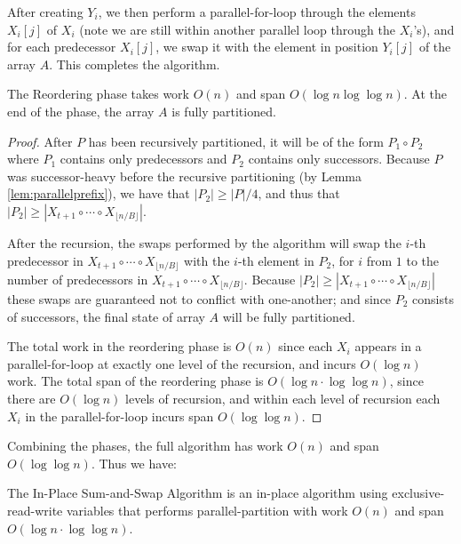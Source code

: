 \documentclass[a4paper,UKenglish,cleveref, autoref, thm-restate]{lipics-v2019}
\begin{document}
After creating $Y_i$, we then perform a parallel-for-loop through the
elements $X_i[j]$ of $X_i$ (note we are still within another parallel
loop through the $X_i$'s), and for each predecessor $X_i[j]$, we swap
it with the element in position $Y_i[j]$ of the array $A$. This
completes the algorithm.

\begin{lemma}
 The Reordering phase takes work $O(n)$ and span $O(\log n \log \log
 n)$. At the end of the phase, the array $A$ is fully partitioned.
\end{lemma}
\begin{proof}
  After $P$ has been recursively partitioned, it will be of the form
  $P_1 \circ P_2$ where $P_1$ contains only predecessors and $P_2$
  contains only successors. Because $P$ was successor-heavy before the
  recursive partitioning (by Lemma \ref{lem:parallelprefix}), we have
  that $|P_2| \ge |P| / 4$, and thus that
  $|P_2| \ge |X_{t + 1} \circ \cdots \circ X_{\lfloor n / B
    \rfloor}|$.

After the recursion, the swaps performed by the algorithm will swap
the $i$-th predecessor in $X_{t + 1} \circ \cdots \circ X_{\lfloor n /
  B \rfloor}$ with the $i$-th element in $P_2$, for $i$ from $1$ to
the number of predecessors in $X_{t + 1} \circ \cdots \circ X_{\lfloor
  n / B \rfloor}$. Because $|P_2| \ge |X_{t + 1} \circ \cdots \circ
X_{\lfloor n / B \rfloor}|$ these swaps are guaranteed not to conflict
with one-another; and since $P_2$ consists of successors, the final
state of array $A$ will be fully partitioned.

The total work in the reordering phase is $O(n)$ since each $X_i$
appears in a parallel-for-loop at exactly one level of the recursion,
and incurs $O(\log n)$ work. The total span of the reordering phase is
$O(\log n \cdot \log \log n)$, since there are $O(\log n)$ levels of
recursion, and within each level of recursion each $X_i$ in the
parallel-for-loop incurs span $O(\log \log n)$. 
\end{proof}

Combining the phases, the full algorithm has work $O(n)$ and span
$O(\log \log n)$. Thus we have:
\begin{theorem}
  The In-Place Sum-and-Swap Algorithm is an in-place algorithm using
  exclusive-read-write variables that performs parallel-partition with
  work $O(n)$ and span $O(\log n \cdot \log \log n)$.
  \label{thminplace}
\end{theorem}
\end{document}

